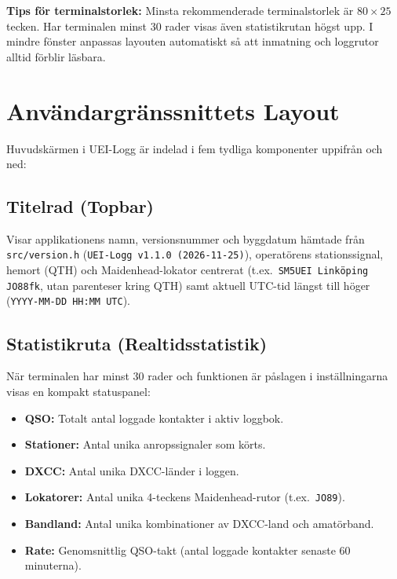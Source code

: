\documentclass[11pt,a4paper]{article}
\begin{document}
\textbf{Tips för terminalstorlek:} Minsta rekommenderade terminalstorlek är $80 \times 25$ tecken. Har terminalen minst 30 rader visas även statistikrutan högst upp. I mindre fönster anpassas layouten automatiskt så att inmatning och loggrutor alltid förblir läsbara.

\section{Användargränssnittets Layout}
\label{sec:layout}

Huvudskärmen i UEI-Logg är indelad i fem tydliga komponenter uppifrån och ned:

\subsection{Titelrad (Topbar)}
Visar applikationens namn, versionsnummer och byggdatum hämtade från \texttt{src/version.h} (\texttt{UEI-Logg v1.1.0 (2026-11-25)}), operatörens stationssignal, hemort (QTH) och Maidenhead-lokator centrerat (t.ex.\ \texttt{SM5UEI Linköping JO88fk}, utan parenteser kring QTH) samt aktuell UTC-tid längst till höger (\texttt{YYYY-MM-DD HH:MM UTC}).

\subsection{Statistikruta (Realtidsstatistik)}
När terminalen har minst 30 rader och funktionen är påslagen i inställningarna visas en kompakt statuspanel:
\begin{itemize}
    \item \textbf{QSO:} Totalt antal loggade kontakter i aktiv loggbok.
    \item \textbf{Stationer:} Antal unika anropssignaler som körts.
    \item \textbf{DXCC:} Antal unika DXCC-länder i loggen.
    \item \textbf{Lokatorer:} Antal unika 4-teckens Maidenhead-rutor (t.ex.\ \texttt{JO89}).
    \item \textbf{Bandland:} Antal unika kombinationer av DXCC-land och amatörband.
    \item \textbf{Rate:} Genomsnittlig QSO-takt (antal loggade kontakter senaste 60 minuterna).
\end{itemize}
\end{document}
